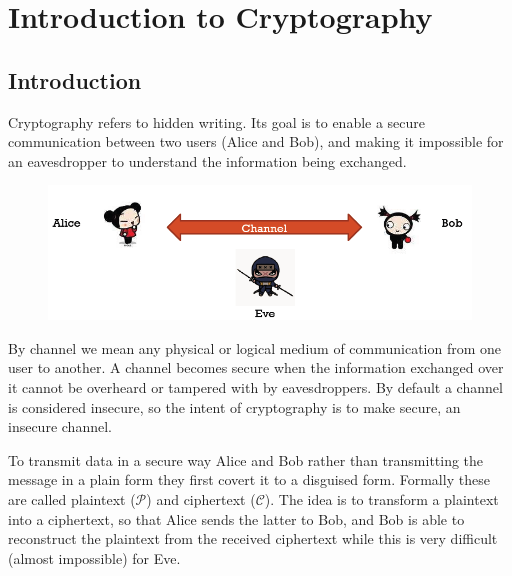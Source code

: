 \chapter{Introduction to Cryptography}

\section{Introduction}
Cryptography refers to hidden writing. Its goal is to enable a secure communication between two users (Alice and Bob), and making it impossible for an eavesdropper to understand the information being exchanged.

\begin{figure}
	\centering
	\includegraphics[width=0.7\linewidth]{Images/Chapter1/screenshot000}
	\caption{}
	\label{fig:screenshot000}
\end{figure}

By channel we mean any physical or logical medium of communication from one user to another. A channel becomes secure when the information exchanged over it cannot be overheard or tampered with by eavesdroppers. By default a channel is considered insecure, so the intent of cryptography is to make secure, an insecure channel.

To transmit data in a secure way Alice and Bob rather than transmitting the message in a plain form they first covert it to a disguised form. Formally these are called plaintext ($\mathcal{P}$) and ciphertext ($\mathcal{C}$). The idea is to transform a plaintext into a ciphertext, so that Alice sends the latter to Bob, and Bob is able to reconstruct the plaintext from the received ciphertext while this is very difficult (almost impossible) for Eve.

